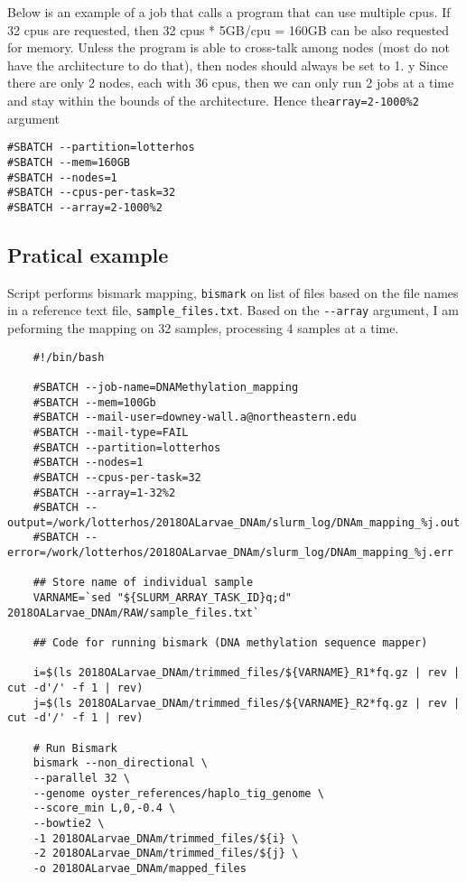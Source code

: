 \documentclass[
  letterpaper,
  DIV=11,
  numbers=noendperiod]{scrreprt}
\begin{document}
Below is an example of a job that calls a program that can use multiple
cpus. If 32 cpus are requested, then 32 cpus * 5GB/cpu = 160GB can be
also requested for memory. Unless the program is able to cross-talk
among nodes (most do not have the architecture to do that), then nodes
should always be set to 1. y Since there are only 2 nodes, each with 36
cpus, then we can only run 2 jobs at a time and stay within the bounds
of the architecture. Hence the\texttt{array=2-1000\%2} argument

\begin{verbatim}
#SBATCH --partition=lotterhos
#SBATCH --mem=160GB
#SBATCH --nodes=1
#SBATCH --cpus-per-task=32
#SBATCH --array=2-1000%2
\end{verbatim}

\hypertarget{pratical-example}{%
\subsection*{\texorpdfstring{\textbf{Pratical
example}}{Pratical example}}\label{pratical-example}}

Script performs bismark mapping, \texttt{bismark} on list of files based
on the file names in a reference text file, \texttt{sample\_files.txt}.
Based on the \texttt{-\/-array} argument, I am peforming the mapping on
32 samples, processing 4 samples at a time.

\begin{verbatim}
    #!/bin/bash

    #SBATCH --job-name=DNAMethylation_mapping
    #SBATCH --mem=100Gb
    #SBATCH --mail-user=downey-wall.a@northeastern.edu
    #SBATCH --mail-type=FAIL
    #SBATCH --partition=lotterhos
    #SBATCH --nodes=1
    #SBATCH --cpus-per-task=32
    #SBATCH --array=1-32%2
    #SBATCH --output=/work/lotterhos/2018OALarvae_DNAm/slurm_log/DNAm_mapping_%j.out
    #SBATCH --error=/work/lotterhos/2018OALarvae_DNAm/slurm_log/DNAm_mapping_%j.err

    ## Store name of individual sample
    VARNAME=`sed "${SLURM_ARRAY_TASK_ID}q;d" 2018OALarvae_DNAm/RAW/sample_files.txt`

    ## Code for running bismark (DNA methylation sequence mapper)

    i=$(ls 2018OALarvae_DNAm/trimmed_files/${VARNAME}_R1*fq.gz | rev | cut -d'/' -f 1 | rev) 
    j=$(ls 2018OALarvae_DNAm/trimmed_files/${VARNAME}_R2*fq.gz | rev | cut -d'/' -f 1 | rev)

    # Run Bismark
    bismark --non_directional \
    --parallel 32 \
    --genome oyster_references/haplo_tig_genome \
    --score_min L,0,-0.4 \
    --bowtie2 \
    -1 2018OALarvae_DNAm/trimmed_files/${i} \
    -2 2018OALarvae_DNAm/trimmed_files/${j} \
    -o 2018OALarvae_DNAm/mapped_files
\end{verbatim}
\end{document}
